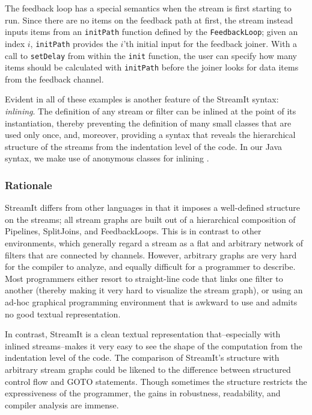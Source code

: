 The feedback loop has a special semantics when the stream is first
starting to run.  Since there are no items on the feedback path at
first, the stream instead inputs items from an {\tt initPath} function
defined by the {\tt FeedbackLoop}; given an index $i$, {\tt initPath}
provides the $i$'th initial input for the feedback joiner.  With a
call to {\tt setDelay} from within the {\tt init} function, the user
can specify how many items should be calculated with {\tt initPath}
before the joiner looks for data items from the feedback channel.

Evident in all of these examples is another feature of the StreamIt
syntax: {\it inlining}.  The definition of any stream or filter can be
inlined at the point of its instantiation, thereby preventing the
definition of many small classes that are used only once, and,
moreover, providing a syntax that reveals the hierarchical structure
of the streams from the indentation level of the code.  In our Java
syntax, we make use of anonymous classes for inlining \cite{java}.

\subsubsection{Rationale}

StreamIt differs from other languages in that it imposes a
well-defined structure on the streams; all stream graphs are built out
of a hierarchical composition of Pipelines, SplitJoins, and
FeedbackLoops.  This is in contrast to other environments, which
generally regard a stream as a flat and arbitrary network of filters
that are connected by channels.  However, arbitrary graphs are very
hard for the compiler to analyze, and equally difficult for a
programmer to describe.  Most programmers either resort to
straight-line code that links one filter to another (thereby making it
very hard to visualize the stream graph), or using an ad-hoc graphical
programming environment that is awkward to use and admits no good
textual representation.

In contrast, StreamIt is a clean textual representation
that--especially with inlined streams--makes it very easy to see the
shape of the computation from the indentation level of the code.  The
comparison of StreamIt's structure with arbitrary stream graphs could
be likened to the difference between structured control flow and GOTO
statements.  Though sometimes the structure restricts the
expressiveness of the programmer, the gains in robustness,
readability, and compiler analysis are immense.

